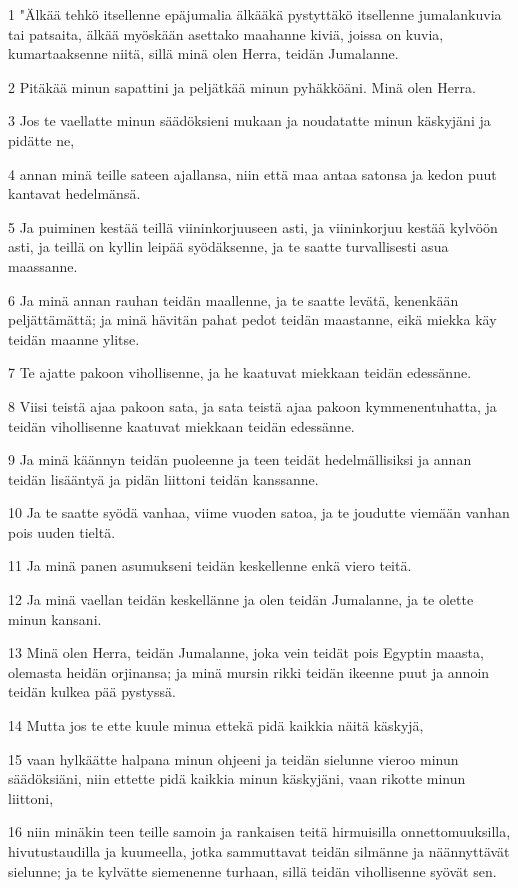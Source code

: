 \par 1 "Älkää tehkö itsellenne epäjumalia älkääkä pystyttäkö itsellenne jumalankuvia tai patsaita, älkää myöskään asettako maahanne kiviä, joissa on kuvia, kumartaaksenne niitä, sillä minä olen Herra, teidän Jumalanne.
\par 2 Pitäkää minun sapattini ja peljätkää minun pyhäkköäni. Minä olen Herra.
\par 3 Jos te vaellatte minun säädöksieni mukaan ja noudatatte minun käskyjäni ja pidätte ne,
\par 4 annan minä teille sateen ajallansa, niin että maa antaa satonsa ja kedon puut kantavat hedelmänsä.
\par 5 Ja puiminen kestää teillä viininkorjuuseen asti, ja viininkorjuu kestää kylvöön asti, ja teillä on kyllin leipää syödäksenne, ja te saatte turvallisesti asua maassanne.
\par 6 Ja minä annan rauhan teidän maallenne, ja te saatte levätä, kenenkään peljättämättä; ja minä hävitän pahat pedot teidän maastanne, eikä miekka käy teidän maanne ylitse.
\par 7 Te ajatte pakoon vihollisenne, ja he kaatuvat miekkaan teidän edessänne.
\par 8 Viisi teistä ajaa pakoon sata, ja sata teistä ajaa pakoon kymmenentuhatta, ja teidän vihollisenne kaatuvat miekkaan teidän edessänne.
\par 9 Ja minä käännyn teidän puoleenne ja teen teidät hedelmällisiksi ja annan teidän lisääntyä ja pidän liittoni teidän kanssanne.
\par 10 Ja te saatte syödä vanhaa, viime vuoden satoa, ja te joudutte viemään vanhan pois uuden tieltä.
\par 11 Ja minä panen asumukseni teidän keskellenne enkä viero teitä.
\par 12 Ja minä vaellan teidän keskellänne ja olen teidän Jumalanne, ja te olette minun kansani.
\par 13 Minä olen Herra, teidän Jumalanne, joka vein teidät pois Egyptin maasta, olemasta heidän orjinansa; ja minä mursin rikki teidän ikeenne puut ja annoin teidän kulkea pää pystyssä.
\par 14 Mutta jos te ette kuule minua ettekä pidä kaikkia näitä käskyjä,
\par 15 vaan hylkäätte halpana minun ohjeeni ja teidän sielunne vieroo minun säädöksiäni, niin ettette pidä kaikkia minun käskyjäni, vaan rikotte minun liittoni,
\par 16 niin minäkin teen teille samoin ja rankaisen teitä hirmuisilla onnettomuuksilla, hivutustaudilla ja kuumeella, jotka sammuttavat teidän silmänne ja näännyttävät sielunne; ja te kylvätte siemenenne turhaan, sillä teidän vihollisenne syövät sen.
